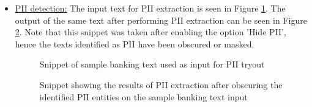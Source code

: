 \begin{itemize}
    \item \uline{\acs{PII} detection:} The input text for \acs{PII} extraction is seen in Figure \ref{piiinput}. The output of the same text after performing \acs{PII} extraction can be seen in Figure \ref{piioutput}. Note that this snippet was taken after enabling the option 'Hide PII', hence the texts identified as \acs{PII} have been obscured or masked.\\
     \begin {figure}[h!h]
        \centering
        \caption{Snippet of sample banking text used as input for \acs{PII} tryout}
        \label{piiinput}
    \end {figure}
    \begin {figure}[h!h]
        \centering
        \caption{Snippet showing the results of \acs{PII} extraction after obscuring the identified \acs{PII} entities on the sample banking text input}
        \label{piioutput}
    \end {figure}
    

\end{itemize}
